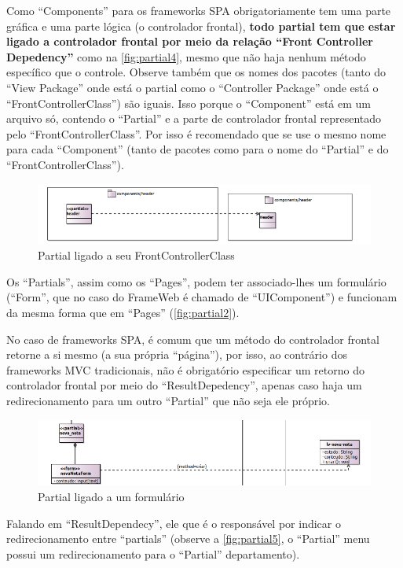 \documentclass[
article,			%
11pt,				%
oneside,			%
a4paper,			%
english,			%
brazil,				%
sumario=tradicional
]{abntex2}
\begin{document}
Como ``Components'' para os frameworks SPA obrigatoriamente tem uma parte gráfica e uma parte lógica (o controlador frontal), \textbf{todo partial tem que estar ligado a controlador frontal por meio da relação ``Front Controller Depedency''} como na \autoref{fig:partial4}, mesmo que não haja nenhum método específico que o controle. Observe também que os nomes dos pacotes (tanto do ``View Package'' onde está o partial como o ``Controller Package'' onde está o ``FrontControllerClass'') são iguais. Isso porque o ``Component'' está em um arquivo só, contendo o ``Partial'' e a parte de controlador frontal representado pelo ``FrontControllerClass''. Por isso é recomendado que se use o mesmo nome para cada ``Component'' (tanto de pacotes como para o nome do ``Partial'' e do ``FrontControllerClass'').

\begin{figure}
	\centering
	\includegraphics[width=0.7\linewidth]{figuras/Partial4}
	\caption{Partial ligado a seu FrontControllerClass}
	\label{fig:partial4}
\end{figure}

Os ``Partials'', assim como os ``Pages'', podem ter associado-lhes um formulário (``Form'', que no caso do FrameWeb é chamado de ``UIComponent'') e funcionam da mesma forma que em ``Pages'' (\autoref{fig:partial2}).

No caso de frameworks SPA, é comum que um método do controlador frontal retorne a si mesmo (a sua própria ``página''), por isso, ao contrário dos frameworks MVC tradicionais, não é obrigatório especificar um retorno do controlador frontal por meio do ``ResultDepedency'', apenas caso haja um redirecionamento para um outro ``Partial'' que não seja ele próprio.

\begin{figure}
	\centering
	\includegraphics[width=0.7\linewidth]{figuras/Partial2}
	\caption{Partial ligado a um formulário}
	\label{fig:partial2}
\end{figure}

Falando em ``ResultDependecy'', ele que é o responsável por indicar o redirecionamento entre ``partials'' (observe a \autoref{fig:partial5}, o ``Partial'' menu possui um redirecionamento para o ``Partial'' departamento).
\end{document}
